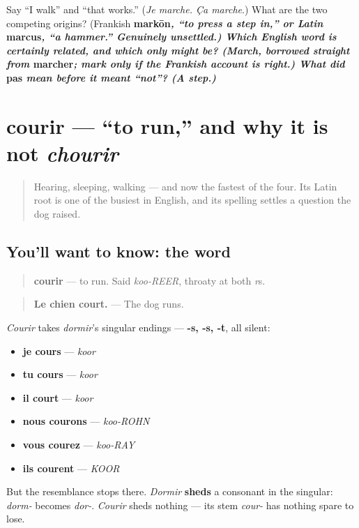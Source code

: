 \begin{tcolorbox}[breakable,colback=teal!4,colframe=teal!35!black,title={Before you move on}]
Say \textquotedblleft{}I walk\textquotedblright{} and \textquotedblleft{}that works.\textquotedblright{} (\emph{Je marche. Ça marche}.) What are the two competing origins? (Frankish \textbf{markōn\emph{, \textquotedblleft{}to press a step in,\textquotedblright{} or Latin }marcus\emph{, \textquotedblleft{}\textbf{a hammer}.\textquotedblright{} Genuinely unsettled.) Which English word is certainly related, and which only might be? (\textbf{March}, borrowed straight from }marcher\emph{; \textbf{mark} only if the Frankish account is right.) What did }pas\emph{ mean before it meant \textquotedblleft{}not\textquotedblright{}? (\textbf{A step}.)}}
\end{tcolorbox}
\section[courir]{courir — \textquotedblleft{}to run,\textquotedblright{} and why it is not \emph{chourir}}

\label{lesson:FR-C26-courir}



\begin{quote}
Hearing, sleeping, walking — and now the fastest of the four. Its Latin root is one of the busiest in English, and its spelling settles a question the dog raised.
\end{quote}

\subsection*{You'll want to know: the word}
\begin{quote}
\textbf{courir} — to run. Said \emph{koo-REER}, throaty at both \emph{r}s.
\end{quote}

\begin{quote}
\textbf{Le chien court.} — The dog runs.
\end{quote}

\begin{grammarlens}[title={Grammar Lens: the same endings, a different stem}]
\emph{Courir} takes \emph{dormir}'s singular endings — \textbf{-s, -s, -t}, all silent:

\begin{itemize}
\raggedright
  \item \textbf{je cours} — \emph{koor}
  \item \textbf{tu cours} — \emph{koor}
  \item \textbf{il court} — \emph{koor}
  \item \textbf{nous courons} — \emph{koo-ROHN}
  \item \textbf{vous courez} — \emph{koo-RAY}
  \item \textbf{ils courent} — \emph{KOOR}
\end{itemize}

But the resemblance stops there. \emph{Dormir} \textbf{sheds} a consonant in the singular: \emph{dorm-} becomes \emph{dor-}. \emph{Courir} sheds nothing — its stem \emph{cour-} has nothing spare to lose.
\end{grammarlens}

